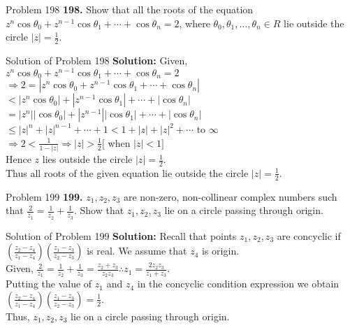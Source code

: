 \documentclass[aspectratio=169,8pt]{beamer}
\begin{document}
\begin{frame}{Problem 198}
  \textbf{198.} Show that all the roots of the equation $z^n\cos\theta_0 + z^{n - 1}\cos\theta_1 + \cdots + \cos\theta_n = 2$,
  where $\theta_0, \theta_1, \ldots, \theta_n\in R$ lie outside the circle $|z| = \frac{1}{2}$.
\end{frame}
\begin{frame}{Solution of Problem 198}
  \textbf{Solution:} Given, $z^n\cos\theta_0 + z^{n - 1}\cos\theta_1 + \cdots + \cos\theta_n = 2$\\
  \vspace*{0.2cm}
  $\Rightarrow 2 = |z^n\cos\theta_0 + z^{n - 1}\cos\theta_1 + \cdots + \cos\theta_n|$\\
  \vspace*{0.2cm}
  $< |z^n\cos\theta_0| + |z^{n - 1}\cos\theta_1| + \cdots + |\cos\theta_n|$\\
  \vspace*{0.2cm}
  $= |z^n||\cos\theta_0| + |z^{n - 1}||\cos\theta_1| + \cdots + |\cos\theta_n|$\\
  \vspace*{0.2cm}
  $\leq |z|^n + |z|^{n - 1}  + \cdots + 1 < 1 + |z| + |z|^2 + \cdots$ to $\infty$\\
  \vspace*{0.2cm}
  $\Rightarrow 2 < \frac{1}{1 - |z|} \Rightarrow |z| > \frac{1}{2} [$ when $|z| < 1]$\\
  \vspace*{0.2cm}
  Hence $z$ lies outside the circle $|z| = \frac{1}{2}$.\\
  \vspace*{0.2cm}
  Thus all roots of the given equation lie outside the circle $|z| = \frac{1}{2}$.
\end{frame}
\begin{frame}{Problem 199}
  \textbf{199.} $z_1, z_2, z_3$ are non-zero, non-collinear complex numbers such that $\frac{2}{z_1} = \frac{1}{z_2} +
  \frac{1}{z_3}$. Show that $z_1, z_2, z_3$ lie on a circle passing through origin.
\end{frame}
\begin{frame}{Solution of Problem 199}
  \textbf{Solution:} Recall that points $z_1, z_2, z_3$ are concyclic if $\left(\frac{z_2 - z_4}{z_1 - z_4}\right)\left(\frac{z_1 -
  z_3}{z_2 - z_3}\right)$ is real. We assume that $z_4$ is origin.\\
  \vspace*{0.2cm}
  Given, $\frac{2}{z_1} = \frac{1}{z_2} + \frac{1}{z_3} = \frac{z_2 + z_3}{z_2z_3} \therefore z_1 = \frac{2z_2z_3}{z_1+z_3}$.\\
  \vspace*{0.2cm}
  Putting the value of $z_1$ and $z_4$ in the concyclic condition expression we obtain\\
  \vspace*{0.2cm}
  $\left(\frac{z_2 - z_4}{z_1 - z_4}\right)\left(\frac{z_1 - z_3}{z_2 - z_3}\right) = \frac{1}{2}$.\\
  \vspace*{0.2cm}
  Thus, $z_1, z_2, z_3$ lie on a circle passing through origin.
\end{frame}
\end{document}

